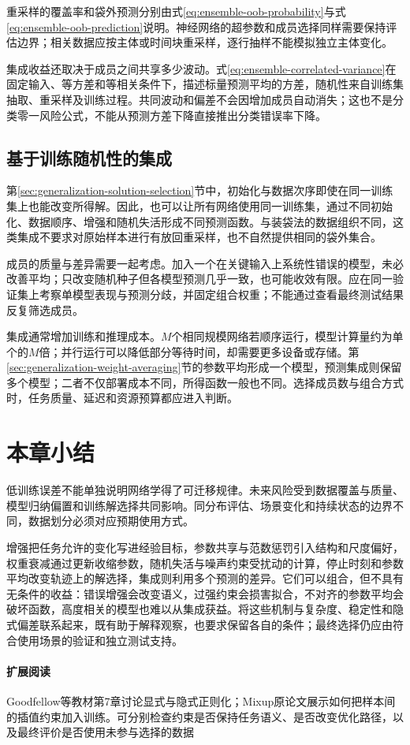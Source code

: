 重采样的覆盖率和袋外预测分别由式\eqref{eq:ensemble-oob-probability}与式\eqref{eq:ensemble-oob-prediction}说明。神经网络的超参数和成员选择同样需要保持评估边界；相关数据应按主体或时间块重采样，逐行抽样不能模拟独立主体变化。

集成收益还取决于成员之间共享多少波动。式\eqref{eq:ensemble-correlated-variance}在固定输入、等方差和等相关条件下，描述标量预测平均的方差，随机性来自训练集抽取、重采样及训练过程。共同波动和偏差不会因增加成员自动消失；这也不是分类零一风险公式，不能从预测方差下降直接推出分类错误率下降。

\subsection{基于训练随机性的集成}
\label{sec:generalization-randomness-ensemble}

第\ref{sec:generalization-solution-selection}节中，初始化与数据次序即使在同一训练集上也能改变所得解。因此，也可以让所有网络使用同一训练集，通过不同初始化、数据顺序、增强和随机失活形成不同预测函数。与装袋法的数据组织不同，这类集成不要求对原始样本进行有放回重采样，也不自然提供相同的袋外集合。

成员的质量与差异需要一起考虑。加入一个在关键输入上系统性错误的模型，未必改善平均；只改变随机种子但各模型预测几乎一致，也可能收效有限。应在同一验证集上考察单模型表现与预测分歧，并固定组合权重；不能通过查看最终测试结果反复筛选成员。

集成通常增加训练和推理成本。$M$个相同规模网络若顺序运行，模型计算量约为单个的$M$倍；并行运行可以降低部分等待时间，却需要更多设备或存储。第\ref{sec:generalization-weight-averaging}节的参数平均形成一个模型，预测集成则保留多个模型；二者不仅部署成本不同，所得函数一般也不同。选择成员数与组合方式时，任务质量、延迟和资源预算都应进入判断。

\section{本章小结}
\label{sec:generalization-summary}

低训练误差不能单独说明网络学得了可迁移规律。未来风险受到数据覆盖与质量、模型归纳偏置和训练解选择共同影响。同分布评估、场景变化和持续状态的边界不同，数据划分必须对应预期使用方式。

增强把任务允许的变化写进经验目标，参数共享与范数惩罚引入结构和尺度偏好，权重衰减通过更新收缩参数，随机失活与噪声约束受扰动的计算，停止时刻和参数平均改变轨迹上的解选择，集成则利用多个预测的差异。它们可以组合，但不具有无条件的收益：错误增强会改变语义，过强约束会损害拟合，不对齐的参数平均会破坏函数，高度相关的模型也难以从集成获益。将这些机制与复杂度、稳定性和隐式偏差联系起来，既有助于解释观察，也要求保留各自的条件；最终选择仍应由符合使用场景的验证和独立测试支持。

\paragraph{扩展阅读}
Goodfellow等教材第7章讨论显式与隐式正则化；Mixup原论文展示如何把样本间的插值约束加入训练。可分别检查约束是否保持任务语义、是否改变优化路径，以及最终评价是否使用未参与选择的数据
